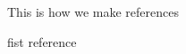 \documentclass[preprint,12pt]{elsarticle}
\begin{document}
This is how we make references \cite{testref}





\begin{thebibliography}{00}


fist reference

\end{thebibliography}
\end{document}
